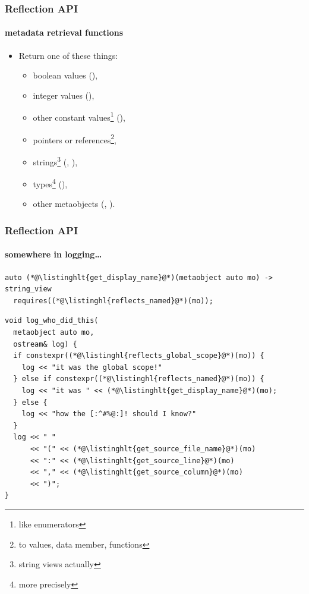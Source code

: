 \documentclass[aspectratio=169,compress,table,xcolor=table]{beamer}
\begin{document}
\begin{frame}
  \frametitle{Reflection API}
  \framesubtitle{metadata retrieval functions}
  \larger
  \begin{itemize}
  \item Return one of these things:
    \begin{itemize}
      \smaller
      \item boolean values (),
      \item integer values (),
      \item other constant values\footnote{like enumerators} (),
      \item pointers or references\footnote{to values, data member, functions},
      \item strings\footnote{string views actually} (,
        ),
      \item types\footnote{more precisely }
        (),
      \item other metaobjects (, ).
    \end{itemize}
  \end{itemize}
\end{frame}
\begin{frame}[fragile]
  \frametitle{Reflection API}
  \framesubtitle{somewhere in logging\ldots}
  \begin{lstlisting}[language=c++2x,basicstyle=\scriptsize\ttfamily]
auto (*@\listinghlt{get_display_name}@*)(metaobject auto mo) -> string_view
  requires((*@\listinghl{reflects_named}@*)(mo));
  \end{lstlisting}
  \begin{lstlisting}[language=c++2x,basicstyle=\footnotesize\ttfamily]
void log_who_did_this(
  metaobject auto mo,
  ostream& log) {
  if constexpr((*@\listinghl{reflects_global_scope}@*)(mo)) {
    log << "it was the global scope!"
  } else if constexpr((*@\listinghl{reflects_named}@*)(mo)) {
    log << "it was " << (*@\listinghlt{get_display_name}@*)(mo);
  } else {
    log << "how the [:^#%@:]! should I know?"
  }
  log << " "
      << "(" << (*@\listinghlt{get_source_file_name}@*)(mo)
      << ":" << (*@\listinghlt{get_source_line}@*)(mo)
      << "," << (*@\listinghlt{get_source_column}@*)(mo)
      << ")";
}
  \end{lstlisting}
\end{frame}
\end{document}
